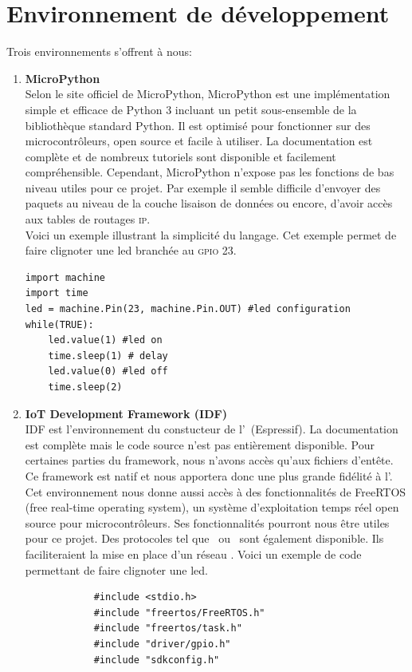 \section{Environnement de développement}
    Trois environnements s'offrent à nous:
    \begin{enumerate}
        \item \textbf{MicroPython}\cite{micropython}\\
            Selon le site officiel de MicroPython, MicroPython
            est une implémentation simple et efficace de Python 3 incluant un
            petit sous-ensemble de la bibliothèque standard Python. Il est
            optimisé pour fonctionner sur des microcontrôleurs, open source et facile à utiliser.
            La documentation est complète et de nombreux tutoriels sont disponible et facilement compréhensible.
            Cependant, MicroPython n'expose pas les fonctions de bas niveau utiles pour ce projet.
            Par exemple il semble difficile d'envoyer des paquets au niveau de la
            couche lisaison de données ou encore, d'avoir accès aux tables de routages \textsc{ip}.\\
            Voici un exemple illustrant la simplicité du langage. Cet exemple permet de faire clignoter
            une led branchée au \textsc{gpio} 23.
            \begin{verbatim}
import machine
import time
led = machine.Pin(23, machine.Pin.OUT) #led configuration
while(TRUE):
    led.value(1) #led on
    time.sleep(1) # delay
    led.value(0) #led off
    time.sleep(2)
            \end{verbatim}
        
        \item \textbf{IoT Development Framework (IDF)}\cite{idf}\\
            IDF est l'environnement du constucteur de l'\esp\ (Espressif).
            La documentation est complète mais le code source n'est pas entièrement
            disponible. Pour certaines parties du framework, nous n'avons accès qu'aux
            fichiers d'entête.
            Ce framework est natif et nous apportera donc une plus grande fidélité à l'\esp.
            Cet environnement nous donne aussi accès à des fonctionnalités de FreeRTOS
            (free real-time operating system), un système d'exploitation temps
            réel open source pour microcontrôleurs. Ses fonctionnalités pourront nous être 
            utiles pour ce projet. 
            Des protocoles tel que \espmesh\ ou
            \espnow\ sont également disponible. Ils faciliteraient la mise en place d'un réseau \mesh.
            Voici un exemple de code permettant de faire clignoter une led.
            \begin{verbatim}
            #include <stdio.h>
            #include "freertos/FreeRTOS.h"
            #include "freertos/task.h"
            #include "driver/gpio.h"
            #include "sdkconfig.h"


\end{verbatim}
\end{enumerate}
